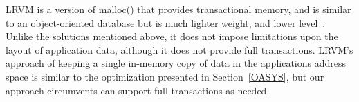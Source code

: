 \documentclass[10pt,letterpaper,twocolumn,english]{article}
\newcommand{\yad}{Lemon\xspace}
\begin{document}

LRVM is a version of malloc() that provides
transactional memory, and is similar to an object-oriented database
but is much lighter weight, and lower level~\cite{lrvm}.  Unlike 
the solutions mentioned above, it does not impose limitations upon 
the layout of application data, although it does not provide full transactions.
LRVM's
approach of keeping a single in-memory copy of data in the applications
address space is similar to the optimization presented in
Section~\ref{OASYS}, but our approach circumvents can support full transactions as needed.


\end{document}
